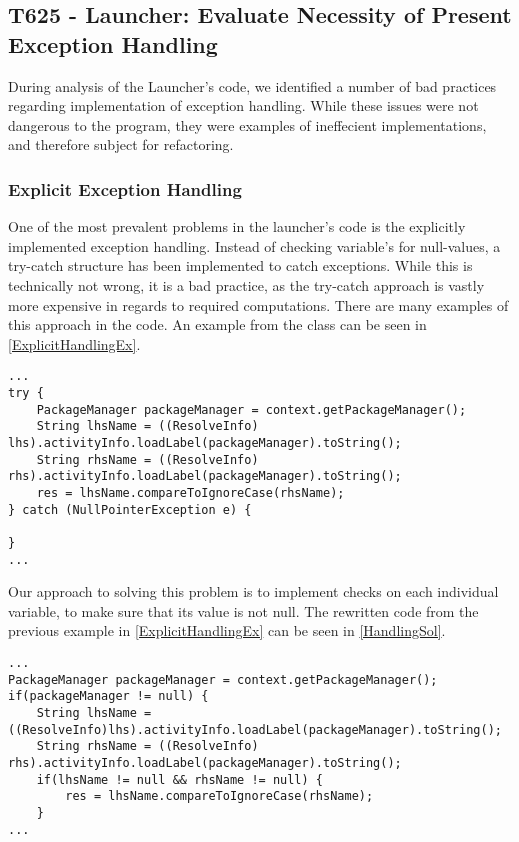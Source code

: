 \subsection{T625 - Launcher: Evaluate Necessity of Present Exception Handling}
During analysis of the Launcher's code, we identified a number of bad practices
regarding implementation of exception handling. While these issues were not
dangerous to the program, they were examples of ineffecient implementations, and
therefore subject for refactoring.

\subsubsection{Explicit Exception Handling}
One of the most prevalent problems in the launcher's code is the explicitly
implemented exception handling. Instead of checking variable's for
null-values, a try-catch structure has been implemented to catch exceptions.
While this is technically not wrong, it is a bad practice, as the try-catch
approach is vastly more expensive in regards to required computations. There are
many examples of this approach in the code. An example from the
 class can be seen in \autoref{ExplicitHandlingEx}.\nl

\begin{minipage}[H]{\linewidth}
\begin{lstlisting}[caption = An example of explicit exception handling., label = ExplicitHandlingEx] 
...
try {
	PackageManager packageManager = context.getPackageManager();
	String lhsName = ((ResolveInfo) lhs).activityInfo.loadLabel(packageManager).toString();
    String rhsName = ((ResolveInfo) rhs).activityInfo.loadLabel(packageManager).toString();
	res = lhsName.compareToIgnoreCase(rhsName);	
} catch (NullPointerException e) {

}
...
\end{lstlisting}
\end{minipage}

Our approach to solving this problem is to implement checks on each individual
variable, to make sure that its value is not null. The rewritten code from the
previous example in \autoref{ExplicitHandlingEx} can be seen in
\autoref{HandlingSol}.\nl

\begin{minipage}[H]{\linewidth}
\begin{lstlisting}[caption = Our approach to variable checking., label = HandlingSol] 
...
PackageManager packageManager = context.getPackageManager();
if(packageManager != null) {
	String lhsName = ((ResolveInfo)lhs).activityInfo.loadLabel(packageManager).toString(); 
	String rhsName = ((ResolveInfo) rhs).activityInfo.loadLabel(packageManager).toString(); 
	if(lhsName != null && rhsName != null) {
    	res = lhsName.compareToIgnoreCase(rhsName);
    }
...
\end{lstlisting}
\end{minipage}

